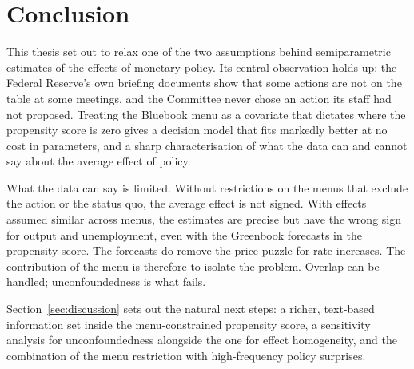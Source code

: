 \section{Conclusion}\label{sec:conclusion}

This thesis set out to relax one of the two assumptions behind semiparametric estimates of the effects of
monetary policy. Its central observation holds up: the Federal Reserve's own briefing documents show that some
actions are not on the table at some meetings, and the Committee never chose an action its staff had not
proposed. Treating the Bluebook menu as a covariate that dictates where the propensity score is zero gives a
decision model that fits markedly better at no cost in parameters, and a sharp characterisation of what the data
can and cannot say about the average effect of policy.

What the data can say is limited. Without restrictions on the menus that exclude the action or the status quo,
the average effect is not signed. With effects assumed similar across menus, the estimates are precise but have
the wrong sign for output and unemployment, even with the Greenbook forecasts in the propensity score. The
forecasts do remove the price puzzle for rate increases. The contribution of the menu is therefore to isolate the
problem. Overlap can be handled; unconfoundedness is what fails.

Section~\ref{sec:discussion} sets out the natural next steps: a richer, text-based information set inside the
menu-constrained propensity score, a sensitivity analysis for unconfoundedness alongside the one for effect
homogeneity, and the combination of the menu restriction with high-frequency policy surprises.
